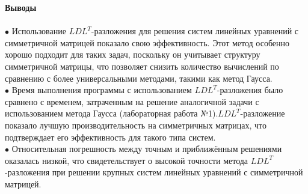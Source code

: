 \documentclass[a4paper, 12pt]{report}
\begin{document}
    \newpage
   \textbf{\Huge{Выводы}}\\\\
      $\bullet$ Использование $LDL^T$-разложения для решения систем линейных уравнений с симметричной матрицей показало свою эффективность. Этот метод особенно хорошо подходит для таких задач, поскольку он учитывает структуру симметричной матрицы, что позволяет снизить количество вычислений по сравнению с более универсальными методами, такими как метод Гаусса.\\
   $\bullet$ Время выполнения программы с использованием $LDL^T$-разложения было сравнено с временем, затраченным на решение аналогичной задачи с использованием метода Гаусса (лабораторная работа №1).$LDL^T$-разложение показало лучшую производительность на симметричных матрицах, что подтверждает его эффективность для такого типа систем.\\
   $\bullet$ Относительная погрешность между точным и приближённым решениями оказалась низкой, что свидетельствует о высокой точности метода $LDL^T$-разложения при решении крупных систем линейных уравнений с симметричной матрицей.\\
   
\end{document}

